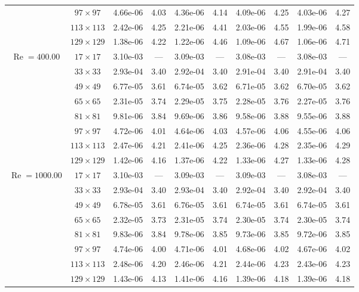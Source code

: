 \documentclass[preprint, 12pt]{elsarticle}
\begin{document}
\begin{center}
\begin{table}[H]
{\begin{tabular*}{\textwidth}{@{\extracolsep\fill}cccccccccc@{}}
& $97\times 97$ & 4.66e-06 & 4.03 & 4.36e-06 & 4.14 & 4.09e-06 & 4.25 & 4.03e-06 & 4.27 \\
& $113\times 113$ & 2.42e-06 & 4.25 & 2.21e-06 & 4.41 & 2.03e-06 & 4.55 & 1.99e-06 & 4.58 \\
& $129\times 129$ & 1.38e-06 & 4.22 & 1.22e-06 & 4.46 & 1.09e-06 & 4.67 & 1.06e-06 & 4.71 \\
    \hline
    \multirow{7}{*}{$\operatorname{Re}=400.00$} & $17\times 17$ & 3.10e-03 & --- & 3.09e-03 & --- & 3.08e-03 & --- & 3.08e-03 & --- \\
& $33\times 33$ & 2.93e-04 & 3.40 & 2.92e-04 & 3.40 & 2.91e-04 & 3.40 & 2.91e-04 & 3.40 \\
& $49\times 49$ & 6.77e-05 & 3.61 & 6.74e-05 & 3.62 & 6.71e-05 & 3.62 & 6.70e-05 & 3.62 \\
\multirow{3}{*}{$\operatorname{Wi}=10$} & $65\times 65$ & 2.31e-05 & 3.74 & 2.29e-05 & 3.75 & 2.28e-05 & 3.76 & 2.27e-05 & 3.76 \\
& $81\times 81$ & 9.81e-06 & 3.84 & 9.69e-06 & 3.86 & 9.58e-06 & 3.88 & 9.55e-06 & 3.88 \\
& $97\times 97$ & 4.72e-06 & 4.01 & 4.64e-06 & 4.03 & 4.57e-06 & 4.06 & 4.55e-06 & 4.06 \\
& $113\times 113$ & 2.47e-06 & 4.21 & 2.41e-06 & 4.25 & 2.36e-06 & 4.28 & 2.35e-06 & 4.29 \\
& $129\times 129$ & 1.42e-06 & 4.16 & 1.37e-06 & 4.22 & 1.33e-06 & 4.27 & 1.33e-06 & 4.28 \\
    \hline
    \multirow{7}{*}{$\operatorname{Re}=1000.00$} & $17\times 17$ & 3.10e-03 & --- & 3.09e-03 & --- & 3.09e-03 & --- & 3.08e-03 & --- \\
& $33\times 33$ & 2.93e-04 & 3.40 & 2.93e-04 & 3.40 & 2.92e-04 & 3.40 & 2.92e-04 & 3.40 \\
& $49\times 49$ & 6.78e-05 & 3.61 & 6.76e-05 & 3.61 & 6.74e-05 & 3.61 & 6.74e-05 & 3.61 \\
\multirow{3}{*}{$\operatorname{Wi}=10$} & $65\times 65$ & 2.32e-05 & 3.73 & 2.31e-05 & 3.74 & 2.30e-05 & 3.74 & 2.30e-05 & 3.74 \\
& $81\times 81$ & 9.83e-06 & 3.84 & 9.78e-06 & 3.85 & 9.73e-06 & 3.85 & 9.72e-06 & 3.85 \\
& $97\times 97$ & 4.74e-06 & 4.00 & 4.71e-06 & 4.01 & 4.68e-06 & 4.02 & 4.67e-06 & 4.02 \\
& $113\times 113$ & 2.48e-06 & 4.20 & 2.46e-06 & 4.21 & 2.44e-06 & 4.23 & 2.43e-06 & 4.23 \\
& $129\times 129$ & 1.43e-06 & 4.13 & 1.41e-06 & 4.16 & 1.39e-06 & 4.18 & 1.39e-06 & 4.18 \\
    \hline
    \end{tabular*}
}
\end{table}
\end{center}
\end{document}

